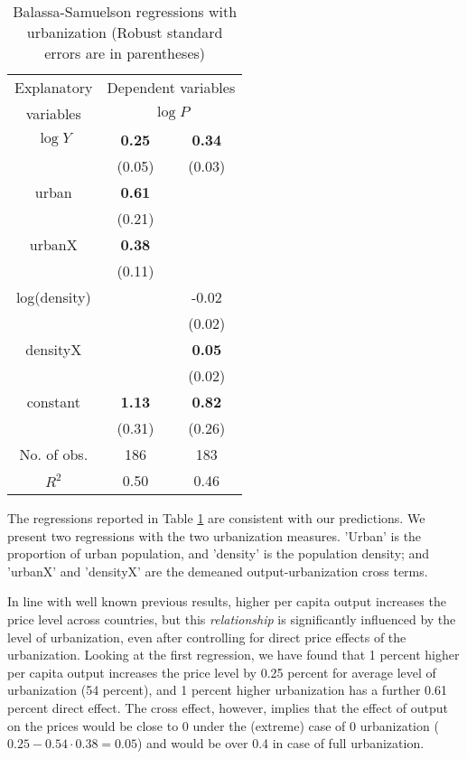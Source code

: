 \documentclass[12pt]{article}
\begin{document}
\begin{table}[h!]
\caption{Balassa-Samuelson regressions with urbanization (Robust
standard errors are in parentheses)} \center \label{tab:BS}
\begin{tabular}{c|cc}
  \hline\hline
  Explanatory & \multicolumn{2}{c}{Dependent variables} \\
  variables &\multicolumn{2}{c}{$\log P$} \\ \hline
  $\log Y$ & \textbf{0.25} & \textbf{0.34} \\
           & (0.05)        & (0.03)        \\
  urban    & \textbf{0.61} &               \\
           & (0.21)        &               \\
  urbanX   & \textbf{0.38} &               \\
           & (0.11)        &               \\
  log(density) &           & -0.02         \\
             &             & (0.02)        \\
  densityX &               & \textbf{0.05} \\
           &               & (0.02)        \\
  constant & \textbf{1.13} & \textbf{0.82} \\
           & (0.31)        & (0.26)        \\ \hline
  No. of obs. & 186        & 183           \\
  $R^2$    & 0.50          & 0.46          \\
  \hline\hline
\end{tabular}
\end{table}

The regressions reported in Table \ref{tab:BS} are consistent with our predictions. We present two regressions with the two urbanization measures. 'Urban' is the proportion of urban population, and 'density' is the population density; and 'urbanX' and 'densityX' are the demeaned
output-urbanization cross terms.

In line with well known previous results, higher per capita output
increases the price level across countries, but this \emph{relationship} is significantly influenced by the level of urbanization, even after controlling for direct price effects of the urbanization. Looking at the first regression, we have found that 1 percent higher per capita output increases the price level by 0.25 percent for average level of urbanization (54 percent), and 1 percent higher urbanization has a further 0.61 percent direct effect. The cross effect, however, implies that the effect of output on the prices would be close to 0 under the (extreme) case of 0 urbanization ($0.25-0.54\cdot0.38=0.05$) and would be over 0.4 in case of full urbanization.
\end{document}
